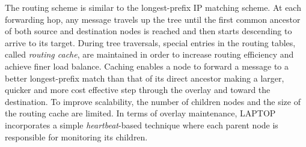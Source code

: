 The routing scheme is similar to the longest-prefix IP matching scheme. At each
forwarding hop, any message travels up the tree until the first common ancestor
of both source and destination nodes is reached and then starts descending to
arrive to its target. During tree traversals, special entries in the routing
tables, called \emph{routing cache}, are maintained in order to increase routing
efficiency and achieve finer load balance. Caching enables a node to forward a
message to a better longest-prefix match than that of its direct ancestor making
a larger, quicker and more cost effective step through the overlay and toward
the destination. To improve scalability, the number of children nodes and the
size of the routing cache are limited. In terms of overlay maintenance, LAPTOP
incorporates a simple \emph{heartbeat}-based technique where each parent node is
responsible for monitoring its children.

%
%



